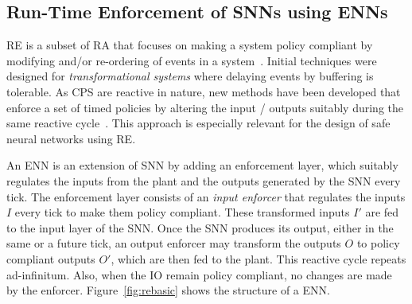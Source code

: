 \subsection{Run-Time Enforcement of \acp{SNN} using \acp{ENN}}


\acf{RE} is a subset of \ac{RA} that focuses on making a system policy
compliant by modifying and/or re-ordering of events in a
system~\cite{theoryRE}. Initial techniques were designed for
\emph{transformational systems} where delaying events by buffering
is tolerable. As \ac{CPS} are reactive in nature, new methods have
been developed that enforce a set of timed policies by altering the
input / outputs suitably during the same reactive
cycle~\cite{RuntimeEnforcementOfCPS}. This approach is especially relevant for the
design of safe neural networks using \ac{RE}.


An \ac{ENN} is an extension of \ac{SNN} by adding an enforcement
layer, which suitably regulates the inputs from the plant and the
outputs generated by the \ac{SNN} every tick. The enforcement layer
consists of an \emph{input enforcer} that regulates the inputs $I$ every
tick to make them policy compliant. These transformed inputs $I'$ are
fed to the input layer of the \ac{SNN}. Once the \ac{SNN} produces its
output, either in the same or a future tick, an output enforcer may
transform the outputs $O$ to policy compliant outputs $O'$, which are
then fed to the plant. This reactive cycle repeats ad-infinitum. Also,
when the IO remain policy compliant, no changes are made by the enforcer.
Figure~\ref{fig:rebasic} shows the structure of a \ac{ENN}.

